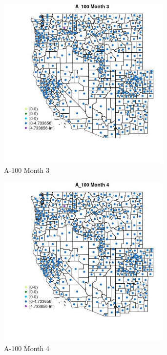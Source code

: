 \begin{figure} 
\centering  
\includegraphics[width=0.77\textwidth]{Code_Outputs/df_report_ML_predictors_CountyCentroid_Locations_Dates_2008-01-01to2018-12-31_MapObsMo3A_100.jpg} 
\caption{\label{fig:df_report_ML_predictors_CountyCentroid_Locations_Dates_2008-01-01to2018-12-31MapObsMo3A_100}A-100 Month 3} 
\end{figure} 
 

\begin{figure} 
\centering  
\includegraphics[width=0.77\textwidth]{Code_Outputs/df_report_ML_predictors_CountyCentroid_Locations_Dates_2008-01-01to2018-12-31_MapObsMo4A_100.jpg} 
\caption{\label{fig:df_report_ML_predictors_CountyCentroid_Locations_Dates_2008-01-01to2018-12-31MapObsMo4A_100}A-100 Month 4} 
\end{figure} 
 

